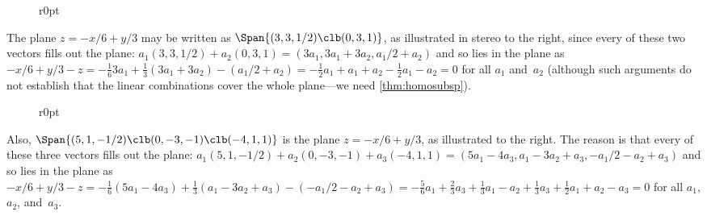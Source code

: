 \begin{figure}r{0pt}
 {}
\end{figure}
\begin{example} \label{eg:plsubs}
The plane \(z=-x/6+y/3\) may be written as \(\Span\{(3,3,1/2)\clb (0,3,1)\}\), as illustrated in stereo to the right, since every  of these two vectors fills out the plane: \(a_1(3,3,1/2)+a_2(0,3,1) =(3a_1,3a_1+3a_2,a_1/2+a_2)\) and so lies in the plane as \(-x/6+y/3-z=-\frac163a_1+\frac13(3a_1+3a_2)-(a_1/2+a_2) =-\frac12a_1+a_1+a_2-\frac12a_1-a_2=0\) for all \(a_1\) and~\(a_2\) (although such arguments do not establish that the linear combinations cover the whole plane---we need \cref{thm:homosubsp}).

\begin{figure}r{0pt}
 {}
\end{figure}
Also,  \(\Span\{(5,1,-1/2)\clb (0,-3,-1)\clb (-4,1,1)\}\) is the  plane \(z=-x/6+y/3\), as illustrated to the right. 
The reason is that every  of these three vectors fills out the plane: \(a_1(5,1,-1/2)+a_2(0,-3,-1)+a_3(-4,1,1) =(5a_1-4a_3, a_1-3a_2+a_3, -a_1/2-a_2+a_3)\) and so lies in the plane as \(-x/6+y/3-z=-\frac16(5a_1-4a_3)+\frac13(a_1-3a_2+a_3)-(-a_1/2-a_2+a_3) =-\frac56a_1+\frac23a_3+\frac13a_1-a_2+\frac13a_3+\frac12a_1+a_2-a_3 =0\) for all \(a_1\), \(a_2\), and~\(a_3\).
\aqed

\end{example}

